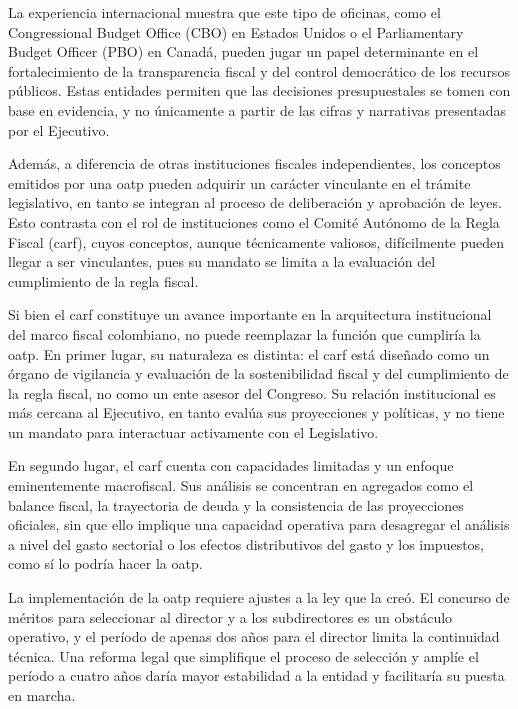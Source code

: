 La experiencia internacional muestra que este tipo de oficinas, como el Congressional Budget Office (CBO) en Estados Unidos o el Parliamentary Budget Officer (PBO) en Canadá, pueden jugar un papel determinante en el fortalecimiento de la transparencia fiscal y del control democrático de los recursos públicos. Estas entidades permiten que las decisiones presupuestales se tomen con base en evidencia, y no únicamente a partir de las cifras y narrativas presentadas por el Ejecutivo.

Además, a diferencia de otras instituciones fiscales independientes, los conceptos emitidos por una \gls{oatp} pueden adquirir un carácter vinculante en el trámite legislativo, en tanto se integran al proceso de deliberación y aprobación de leyes. Esto contrasta con el rol de instituciones como el Comité Autónomo de la Regla Fiscal (\gls{carf}), cuyos conceptos, aunque técnicamente valiosos, difícilmente pueden llegar a ser vinculantes, pues su mandato se limita a la evaluación del cumplimiento de la regla fiscal.

Si bien el \gls{carf} constituye un avance importante en la arquitectura institucional del marco fiscal colombiano, no puede reemplazar la función que cumpliría la \gls{oatp}. En primer lugar, su naturaleza es distinta: el \gls{carf} está diseñado como un órgano de vigilancia y evaluación de la sostenibilidad fiscal y del cumplimiento de la regla fiscal, no como un ente asesor del Congreso. Su relación institucional es más cercana al Ejecutivo, en tanto evalúa sus proyecciones y políticas, y no tiene un mandato para interactuar activamente con el Legislativo.

En segundo lugar, el \gls{carf} cuenta con capacidades limitadas y un enfoque eminentemente macrofiscal. Sus análisis se concentran en agregados como el balance fiscal, la trayectoria de deuda y la consistencia de las proyecciones oficiales, sin que ello implique una capacidad operativa para desagregar el análisis a nivel del gasto sectorial o los efectos distributivos del gasto y los impuestos, como sí lo podría hacer la \gls{oatp}.

La implementación de la \gls{oatp} requiere ajustes a la ley que la creó. El concurso de méritos para seleccionar al director y a los subdirectores es un obstáculo operativo, y el período de apenas dos años para el director limita la continuidad técnica. Una reforma legal que simplifique el proceso de selección y amplíe el período a cuatro años daría mayor estabilidad a la entidad y facilitaría su puesta en marcha.


